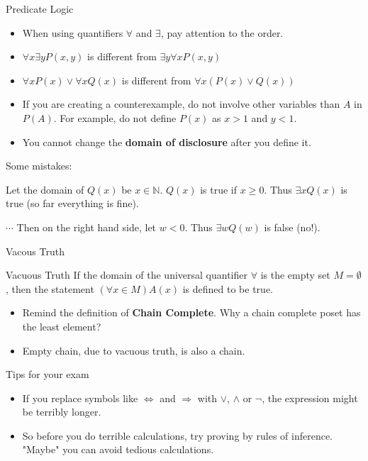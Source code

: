 \begin{frame}{Predicate Logic}
    \begin{itemize}
        \item When using quantifiers $\forall$ and $\exists$, pay attention to the order.
        \item $\forall x\exists y P(x,y)$ is different from $\exists y\forall x P(x,y)$
        \item $\forall xP(x)\vee \forall xQ(x)$ is different from $\forall x(P(x)\vee Q(x))$
        \item If you are creating a counterexample, do not involve other variables than $A$ in $P(A)$. For example, do not define $P(x)$ as $x>1$ and $y<1$.
        \item You cannot change the \textbf{domain of disclosure} after you define it.
    \end{itemize}
    Some mistakes:
    \begin{example}
        Let the domain of $Q(x)$ be $x\in\mathbb{N}$. $Q(x)$ is true if $x\geq 0$. Thus $\exists x Q(x)$ is true (so far everything is fine).
        
        $\cdots$ Then on the right hand side, let $w<0$. Thus $\exists w Q(w)$ is false (no!).
    \end{example}
\end{frame}

\begin{frame}{Vacous Truth}
    \begin{block}{Vacuous Truth}
        If the domain of the universal quantifier $\forall$ is the empty set $M=\emptyset$, then the statement $(\forall x\in M)A(x)$ is defined to be true.
    \end{block}
    \begin{itemize}
        \item Remind the definition of \textbf{Chain Complete}. Why a chain complete poset has the least element?
        \item Empty chain, due to vacuous truth, is also a chain.
    \end{itemize}
\end{frame}

\begin{frame}{Tips for your exam}
    \begin{itemize}
        \item If you replace symbols like $\Leftrightarrow$ and $\Rightarrow$ with $\vee$, $\wedge$ or $\neg$, the expression might be terribly longer.
        \item So before you do terrible calculations, try proving by rules of inference. "Maybe" you can avoid tedious calculations.
    \end{itemize}
\end{frame}

